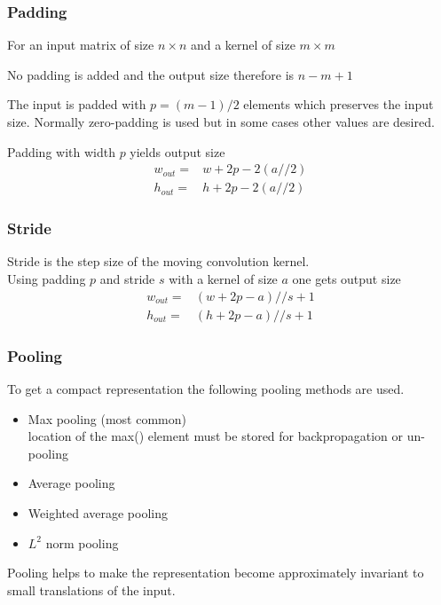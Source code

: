 \subsubsection{Padding}

For an input matrix of size $n\times n$ and a kernel of size $m\times m$

\newpar{}

No padding is added and the output size therefore is $n-m+1$

\newpar{}

The input is padded with $p=(m-1)/2$ elements which preserves the input size. Normally zero-padding is used but in some cases other values are desired.

\newpar{}

Padding with width $p$ yields output size
\begin{align*}
    w_{out}= & w+2p-2(a//2) \\
    h_{out}= & h+2p-2(a//2)
\end{align*}

\subsubsection{Stride}
Stride is the step size of the moving convolution kernel.\\
Using padding $p$ and stride $s$ with a kernel of size $a$ one gets output size
\begin{align*}
    w_{out}= & (w+2p-a)//s + 1 \\
    h_{out}= & (h+2p-a)//s + 1
\end{align*}


\subsubsection{Pooling}
To get a compact representation the following pooling methods are used.
\begin{itemize}
    \item Max pooling (most common)
          \\ location of the max() element must be stored for backpropagation or un-pooling
    \item Average pooling
    \item Weighted average pooling
    \item $L^2$ norm pooling
\end{itemize}

Pooling helps to make the representation become approximately invariant to small translations of the input.

